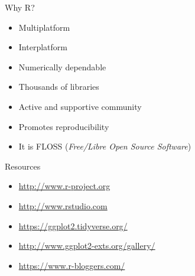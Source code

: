 \documentclass{beamer}
\begin{document}
\begin{frame}{Why R?}
	\begin{itemize}
		\item Multiplatform
		\item Interplatform
		\item Numerically dependable
		\item Thousands of libraries
		\item Active and supportive community
		\item Promotes reproducibility
		\item It is FLOSS (\textit{Free/Libre Open Source Software})
	\end{itemize}
\end{frame}

\begin{frame}{Resources}
	\begin{itemize}
		\item \url{http://www.r-project.org}
		\item \url{http://www.rstudio.com}
		\item \url{https://ggplot2.tidyverse.org/}
		\item \url{http://www.ggplot2-exts.org/gallery/}
		\item \url{https://www.r-bloggers.com/}
	\end{itemize}
	
\end{frame}
\end{document}
